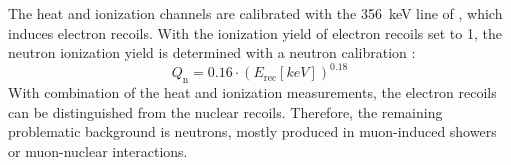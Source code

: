   The heat and ionization channels are calibrated with the \SI{356}{keV} line of , which induces electron recoils. With the ionization yield of electron recoils set to 1, the neutron ionization yield is determined with a neutron calibration \cite{Dis01}:
  \begin{equation}
    Q_{\mathrm{n}}=0.16\cdot(E_{\mathrm{rec}}[\si{keV}])^{0.18}
  \end{equation}
  With combination of the heat and ionization measurements, the electron recoils can be distinguished from the nuclear recoils. Therefore, the remaining problematic background is neutrons, mostly produced in muon-induced showers or muon-nuclear interactions.
